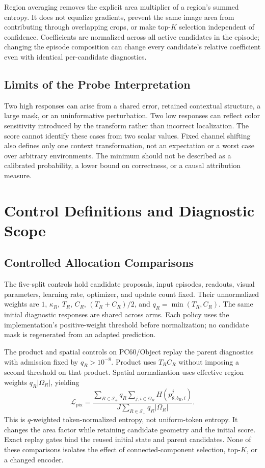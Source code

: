 Region averaging removes the explicit area multiplier of a region's summed entropy. It does not equalize gradients, prevent the same image area from contributing through overlapping crops, or make top-$K$ selection independent of confidence. Coefficients are normalized across all active candidates in the episode; changing the episode composition can change every candidate's relative coefficient even with identical per-candidate diagnostics.

\subsection{Limits of the Probe Interpretation}
Two high responses can arise from a shared error, retained contextual structure, a large mask, or an uninformative perturbation. Two low responses can reflect color sensitivity introduced by the transform rather than incorrect localization. The score cannot identify these cases from two scalar values. Fixed channel shifting also defines only one context transformation, not an expectation or a worst case over arbitrary environments. The minimum should not be described as a calibrated probability, a lower bound on correctness, or a causal attribution measure.

\section{Control Definitions and Diagnostic Scope}
\label{app:mechanism}
\subsection{Controlled Allocation Comparisons}
The five-split controls hold candidate proposals, input episodes, readouts, visual parameters, learning rate, optimizer, and update count fixed. Their unnormalized weights are $1$, $\kappa_R$, $T_R$, $C_R$, $(T_R+C_R)/2$, and $q_R=\min(T_R,C_R)$. The same initial diagnostic responses are shared across arms. Each policy uses the implementation's positive-weight threshold before normalization; no candidate mask is regenerated from an adapted prediction.



The product and spatial controls on PC60/Object replay the parent diagnostics with admission fixed by $q_R>10^{-8}$. Product uses $T_RC_R$ without imposing a second threshold on that product. Spatial normalization uses effective region weights $q_R|\Omega_R|$, yielding
\begin{equation}
\mathcal L_{\mathrm{pix}}=
\frac{\sum_{R\in\mathcal S_+}q_R\sum_{j,i\in\Omega_R}H(p^j_{\theta,b_R,i})}
{J\sum_{R\in\mathcal S_+}q_R|\Omega_R|}.
\end{equation}
This is $q$-weighted token-normalized entropy, not uniform-token entropy. It changes the area factor while retaining candidate geometry and the initial score. Exact replay gates bind the reused initial state and parent candidates. None of these comparisons isolates the effect of connected-component selection, top-$K$, or a changed encoder.

